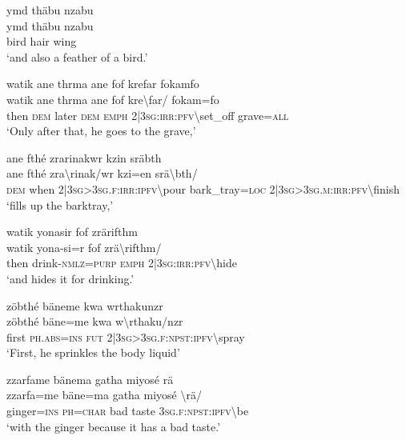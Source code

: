 \ea\label{ex:a4307}
ymd thäbu nzabu\\
\gll ymd	thäbu	nzabu\\
     bird	hair	wing\\
\glt `and also a feather of a bird.'
\z

\ea\label{ex:a4308}
watik ane thrma ane fof krefar fokamfo\\
\gll watik	ane	thrma	ane	fof	kre{\textbackslash}far/	fokam=fo\\
     then	\textsc{dem}	later	\textsc{dem}	\textsc{emph}	2|3\textsc{sg}:\textsc{irr}:\textsc{pfv}{\textbackslash}set\_off	grave=\textsc{all}\\
\glt `Only after that, he goes to the grave,'
\z

\ea\label{ex:a4309}
ane fthé zrarinakwr kzin sräbth\\
\gll ane	fthé	zra{\textbackslash}rinak/wr	kzi=en	srä{\textbackslash}bth/\\
     \textsc{dem}	when	2|3\textsc{sg}>3\textsc{sg}.\textsc{f}:\textsc{irr}:\textsc{ipfv}{\textbackslash}pour	bark\_tray=\textsc{loc}	2|3\textsc{sg}>3\textsc{sg}.\textsc{m}:\textsc{irr}:\textsc{pfv}{\textbackslash}finish\\
\glt `fills up the barktray,'
\z

\ea\label{ex:a4312}
watik yonasir fof zrärifthm\\
\gll watik	yona-si=r	fof	zrä{\textbackslash}rifthm/\\
     then	drink-\textsc{nmlz}=\textsc{purp}	\textsc{emph}	2|3\textsc{sg}:\textsc{irr}:\textsc{pfv}{\textbackslash}hide\\
\glt `and hides it for drinking.'
\z

\ea\label{ex:a4313}
zöbthé bäneme kwa wrthakunzr\\
\gll zöbthé	bäne=me	kwa	w{\textbackslash}rthaku/nzr\\
     first	\textsc{ph}.\textsc{abs}=\textsc{ins}	\textsc{fut}	2|3\textsc{sg}>3\textsc{sg}.\textsc{f}:\textsc{npst}:\textsc{ipfv}{\textbackslash}spray\\
\glt `First, he sprinkles the body liquid'
\z

\ea\label{ex:a4314}
zzarfame bänema gatha miyosé rä\\
\gll zzarfa=me	bäne=ma	gatha	miyosé	{\textbackslash}rä/\\
     ginger=\textsc{ins}	\textsc{ph}=\textsc{char}	bad	taste	3\textsc{sg}.\textsc{f}:\textsc{npst}:\textsc{ipfv}{\textbackslash}be\\
\glt `with the ginger because it has a bad taste.'
\z

